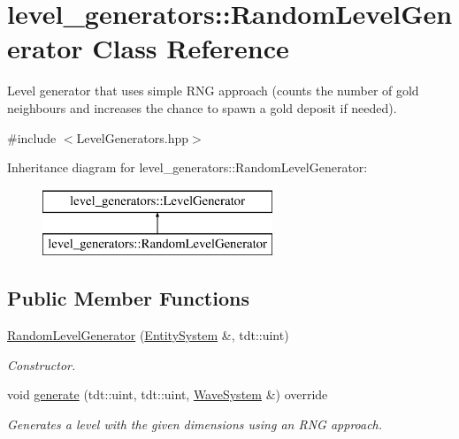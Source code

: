 \hypertarget{classlevel__generators_1_1_random_level_generator}{}\section{level\+\_\+generators\+:\+:Random\+Level\+Generator Class Reference}
\label{classlevel__generators_1_1_random_level_generator}


Level generator that uses simple R\+NG approach (counts the number of gold neighbours and increases the chance to spawn a gold deposit if needed).  




{\ttfamily \#include $<$Level\+Generators.\+hpp$>$}

Inheritance diagram for level\+\_\+generators\+:\+:Random\+Level\+Generator\+:\begin{figure}[H]
\begin{center}
\leavevmode
\includegraphics[height=2.000000cm]{classlevel__generators_1_1_random_level_generator}
\end{center}
\end{figure}
\subsection*{Public Member Functions}
\begin{DoxyCompactItemize}
\item 
\hyperlink{classlevel__generators_1_1_random_level_generator_ae599a19573e7ac5ffb0c4834754df933}{Random\+Level\+Generator} (\hyperlink{class_entity_system}{Entity\+System} \&, tdt\+::uint)
\begin{DoxyCompactList}\small\item\em Constructor. \end{DoxyCompactList}\item 
void \hyperlink{classlevel__generators_1_1_random_level_generator_a085098cd10565bd3f9c6b13f68fcc1cb}{generate} (tdt\+::uint, tdt\+::uint, \hyperlink{class_wave_system}{Wave\+System} \&) override
\begin{DoxyCompactList}\small\item\em Generates a level with the given dimensions using an R\+NG approach. \end{DoxyCompactList}\end{DoxyCompactItemize}
